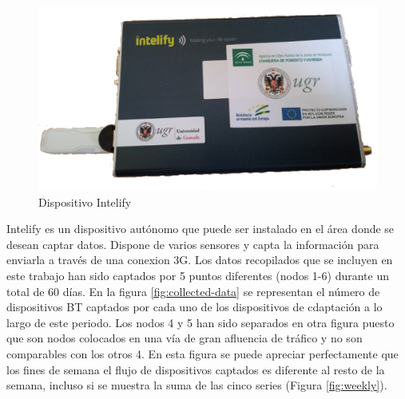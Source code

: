 \documentclass[runningheads]{llncs}
\begin{document}
\begin{figure}[ht] 
\begin{center} 
\includegraphics[scale=0.6]{intelifychisme1.eps}
\end{center} 
\caption{Dispositivo Intelify} 
\label{intelify} 
\end{figure} 

Intelify es un dispositivo autónomo que puede ser instalado en el área donde se desean captar
datos. Dispone de varios sensores y capta la información para enviarla a través de una conexion 3G. 
Los datos recopilados que se incluyen en este trabajo han sido captados por 5 puntos diferentes
(nodos 1-6) durante un total de 60 días. En la figura \ref{fig:collected-data} se representan el
número de dispositivos BT captados por cada uno de los dispositivos de cdaptación a lo largo de este
periodo. Los nodos 4 y 5  han sido separados en otra figura puesto que son nodos colocados en una
vía de gran afluencia de tráfico y no son comparables con los otros 4. En esta figura se puede
apreciar perfectamente que los fines de semana el flujo de dispositivos captados es diferente al
resto de la
semana, incluso si se muestra la suma de las cinco series (Figura \ref{fig:weekly}).
\end{document}
